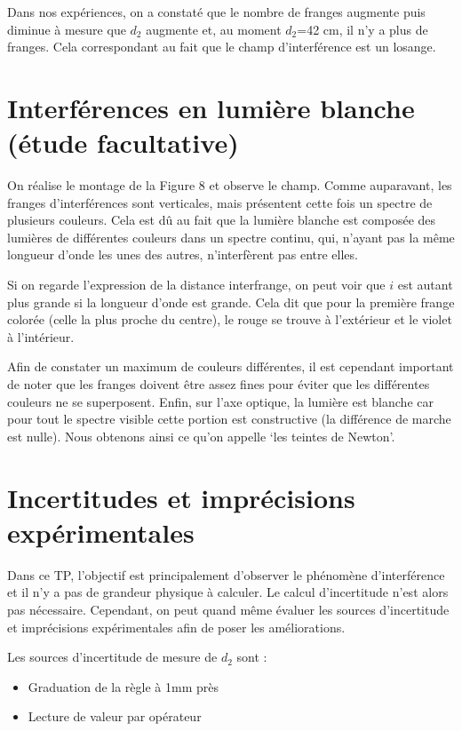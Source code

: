 \documentclass[11pt, a4paper]{article}
\begin{document}
Dans nos expériences, on a constaté que le nombre de franges augmente puis diminue à mesure que $d_2$ augmente et, au moment $d_2$=42 cm, il n'y a plus de franges. Cela correspondant au fait que le champ d'interférence est un losange.


\section{Interférences en lumière blanche (étude facultative)}
On réalise le montage de la Figure 8 et observe le champ. Comme auparavant, les franges d'interférences sont verticales, mais présentent cette fois un spectre de plusieurs couleurs. Cela est dû au fait que la lumière blanche est composée des lumières de différentes couleurs dans un spectre continu, qui, n'ayant pas la même longueur d'onde les unes des autres, n'interfèrent pas entre elles.

Si on regarde l'expression de la distance interfrange, on peut voir que $i$ est autant plus grande si la longueur d'onde est grande. Cela dit que pour la première frange colorée (celle la plus proche du centre), le rouge se trouve à l'extérieur et le violet à l'intérieur.

Afin de constater un maximum de couleurs différentes, il est cependant important de noter que les franges doivent être assez fines pour éviter que les différentes couleurs ne se superposent. Enfin, sur l'axe optique, la lumière est blanche car pour tout le spectre visible cette portion est constructive (la différence de marche est nulle). Nous obtenons ainsi ce qu'on appelle ‘les teintes de Newton'.

\section{Incertitudes et imprécisions expérimentales}
Dans ce TP, l'objectif est principalement d'observer le phénomène d'interférence et il n'y a pas de grandeur physique à calculer. Le calcul d'incertitude n'est alors pas nécessaire. Cependant, on peut quand même évaluer les sources d'incertitude et imprécisions expérimentales afin de poser les améliorations.

Les sources d'incertitude de mesure de $d_2$ sont :
\begin{itemize}
    \item Graduation de la règle à 1mm près
    \item Lecture de valeur par opérateur
\end{itemize}
\end{document}
